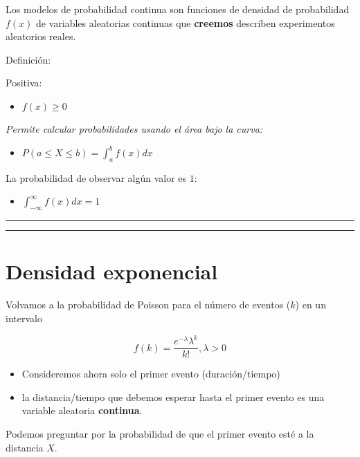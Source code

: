 \documentclass[
]{book}
\providecommand{\tightlist}{%
  \setlength{\itemsep}{0pt}\setlength{\parskip}{0pt}}
\begin{document}
Los modelos de probabilidad continua son funciones de densidad de probabilidad \(f(x)\) de variables aleatorias continuas que \textbf{creemos} describen experimentos aleatorios reales.

Definición:

Positiva:

\begin{itemize}
\tightlist
\item
  \(f(x) \geq 0\)
\end{itemize}

\emph{Permite calcular probabilidades usando el área bajo la curva:}

\begin{itemize}
\tightlist
\item
  \(P(a\leq X \leq b)=\int_{a}^{b} f(x) dx\)
\end{itemize}

La probabilidad de observar algún valor es \(1\):

\begin{itemize}
\tightlist
\item
  \(\int_{-\infty}^{\infty} f(x) dx = 1\)
\end{itemize}

\begin{center}\rule{0.5\linewidth}{0.5pt}\end{center}

\begin{center}\rule{0.5\linewidth}{0.5pt}\end{center}

\hypertarget{densidad-exponencial}{%
\section{Densidad exponencial}\label{densidad-exponencial}}

Volvamos a la probabilidad de Poisson para el número de eventos (\(k\)) en un intervalo

\[f(k)=\frac{e^{-\lambda}\lambda^k}{k!}, \lambda>0\]

\begin{itemize}
\item
  Consideremos ahora solo el primer evento (duración/tiempo)
\item
  la distancia/tiempo que debemos esperar hasta el primer evento es una variable aleatoria \textbf{continua}.
\end{itemize}

Podemos preguntar por la probabilidad de que el primer evento esté a la distancia \(X\).
\end{document}
